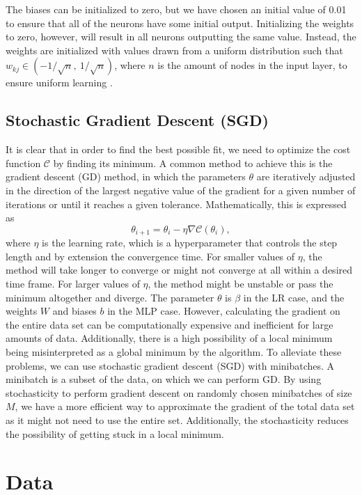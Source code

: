 \documentclass[a4paper, 11pt, twocolumn]{article}
\begin{document}
The biases can be initialized to zero, but we have chosen an initial value of 0.01 to ensure that all of the neurons have some initial output. Initializing the weights to zero, however, will result in all neurons outputting the same value. Instead, the  weights are initialized with values drawn from a uniform distribution such that $w_{kj}\in (-1/\sqrt{n}, \ 1/\sqrt{n})$, where $n$ is the amount of nodes in the input layer,  to ensure uniform learning \cite{ML_algo}.

\subsection{Stochastic Gradient Descent (SGD)}
It is clear that in order to find the best possible fit, we need to optimize the cost function $\mathcal{C}$ by finding its minimum. A common method to achieve this is the gradient descent (GD) method, in which the parameters $\theta$ are iteratively adjusted in the direction of the largest negative value of the gradient for a given number of iterations or until it reaches a given tolerance. Mathematically, this is expressed as
\begin{equation}
\theta_{i+1} = \theta_i -\eta \nabla \mathcal{C}(\theta_i),
\end{equation}
where $\eta$ is the learning rate, which is a hyperparameter that controls the step length and by extension the convergence time. For smaller values of $\eta$, the method will take longer to converge or might not converge at all within a desired time frame. For larger values of $\eta$, the method might be unstable or pass the minimum altogether and diverge. The parameter $\theta$ is $\beta$ in the LR case, and the weights $W$ and biases $b$ in the MLP case.
However, calculating the gradient on the entire data set can be computationally expensive and inefficient for large amounts of data. Additionally, there is a high possibility of a local minimum being misinterpreted as a global minimum by the algorithm.
To alleviate these problems, we can use stochastic gradient descent (SGD) with minibatches.  A minibatch is a subset of the data, on which we can perform GD. By using stochasticity to perform gradient descent on randomly chosen minibatches of size $M$, we have a more efficient way to approximate the gradient of the total data set as it might not need to use the entire set. Additionally, the stochasticity reduces the possibility of getting stuck in a local minimum.

\section{Data}
\end{document}
